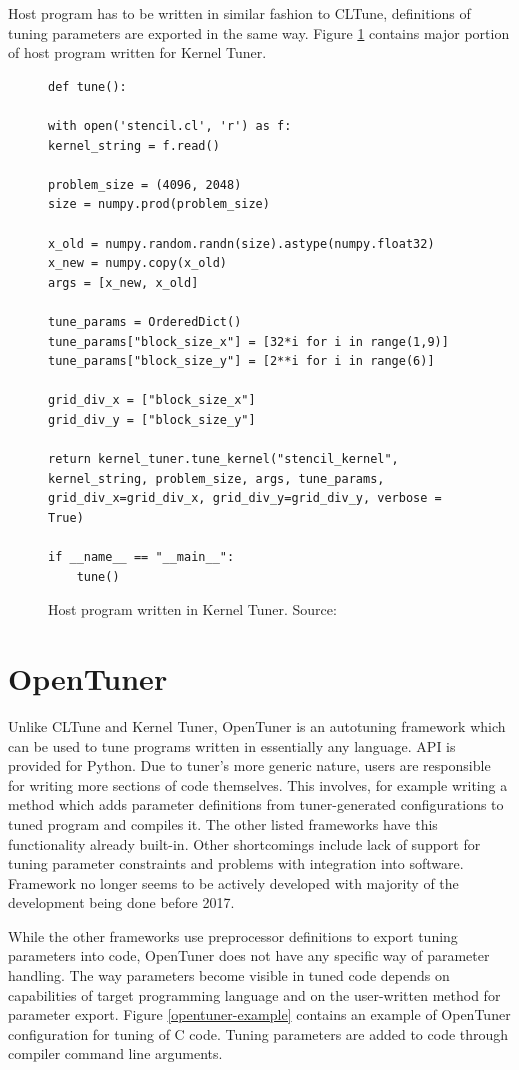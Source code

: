 \documentclass
[
    digital, %
    oneside, %
    table, %
    nolof, %
    nolot, %
    nocover %
]{fithesis3}
\begin{document}
Host program has to be written in similar fashion to CLTune, definitions of tuning parameters are exported in the same way. Figure \ref{kerneltuner-example}
contains major portion of host program written for Kernel Tuner.
\begin{figure}
\begin{lstlisting}
def tune():

with open('stencil.cl', 'r') as f:
kernel_string = f.read()

problem_size = (4096, 2048)
size = numpy.prod(problem_size)

x_old = numpy.random.randn(size).astype(numpy.float32)
x_new = numpy.copy(x_old)
args = [x_new, x_old]

tune_params = OrderedDict()
tune_params["block_size_x"] = [32*i for i in range(1,9)]
tune_params["block_size_y"] = [2**i for i in range(6)]

grid_div_x = ["block_size_x"]
grid_div_y = ["block_size_y"]

return kernel_tuner.tune_kernel("stencil_kernel", kernel_string, problem_size, args, tune_params, grid_div_x=grid_div_x, grid_div_y=grid_div_y, verbose = True)

if __name__ == "__main__":
    tune()
\end{lstlisting}
\caption{Host program written in Kernel Tuner. Source: \cite{kerneltuner-example}}
\label{kerneltuner-example}
\end{figure}

\section{OpenTuner}
Unlike CLTune and Kernel Tuner, OpenTuner \cite{opentuner} is an autotuning framework which can be used to tune programs written in essentially any
language. API is provided for Python. Due to tuner's more generic nature, users are responsible for writing more sections of code themselves. This
involves, for example writing a method which adds parameter definitions from tuner-generated configurations to tuned program and compiles it. The
other listed frameworks have this functionality already built-in. Other shortcomings include lack of support for tuning parameter constraints and
problems with integration into software. Framework no longer seems to be actively developed with majority of the development being done before 2017.

While the other frameworks use preprocessor definitions to export tuning parameters into code, OpenTuner does not have any specific way of parameter
handling. The way parameters become visible in tuned code depends on capabilities of target programming language and on the user-written method for
parameter export. Figure \ref{opentuner-example} contains an example of OpenTuner configuration for tuning of C code. Tuning parameters are added
to code through compiler command line arguments.
\end{document}
